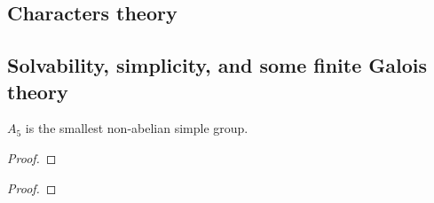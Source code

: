    \subsection{Characters theory}

    \subsection{Solvability, simplicity, and some finite Galois theory}
        \begin{definition} \label{def: solvable_groups}
            
        \end{definition}

        \begin{definition} \label{def: simple_groups}
            
        \end{definition}

        \begin{lemma}
            $A_5$ is the smallest non-abelian simple group.
        \end{lemma}
            \begin{proof}
                
            \end{proof}
        \begin{theorem} \label{theorem: solvability_of_finite_galois_groups}
            
        \end{theorem}
            \begin{proof}
                
            \end{proof}